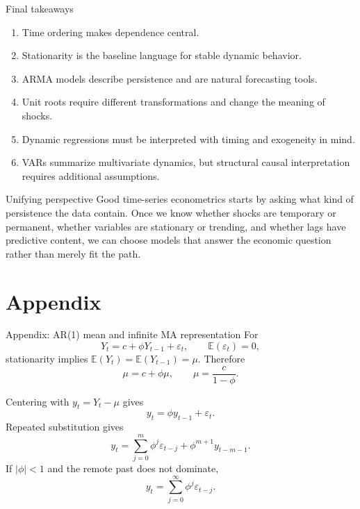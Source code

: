 \documentclass[10pt]{beamer}
\newcommand{\E}{\mathbb{E}}
\newcommand{\eps}{\varepsilon}
\begin{document}
\begin{frame}{Final takeaways}
\small
\begin{enumerate}
  \item Time ordering makes dependence central.
  \item Stationarity is the baseline language for stable dynamic behavior.
  \item ARMA models describe persistence and are natural forecasting tools.
  \item Unit roots require different transformations and change the meaning of shocks.
  \item Dynamic regressions must be interpreted with timing and exogeneity in mind.
  \item VARs summarize multivariate dynamics, but structural causal interpretation requires additional assumptions.
\end{enumerate}

\pause
\begin{alertblock}{Unifying perspective}
Good time-series econometrics starts by asking what kind of persistence the data contain. Once we know whether shocks are temporary or permanent, whether variables are stationary or trending, and whether lags have predictive content, we can choose models that answer the economic question rather than merely fit the path.
\end{alertblock}
\end{frame}

\appendix
\section*{Appendix}

\begin{frame}{Appendix: AR(1) mean and infinite MA representation}
\label{app:ar1-moments}
\small
For
\[
Y_t=c+\phi Y_{t-1}+\eps_t,
\qquad
\E(\eps_t)=0,
\]
stationarity implies $\E(Y_t)=\E(Y_{t-1})=\mu$. Therefore
\[
\mu=c+\phi\mu,
\qquad
\mu=\frac{c}{1-\phi}.
\]

Centering with $y_t=Y_t-\mu$ gives
\[
y_t=\phi y_{t-1}+\eps_t.
\]
Repeated substitution gives
\[
y_t=\sum_{j=0}^{m}\phi^j\eps_{t-j}+\phi^{m+1}y_{t-m-1}.
\]
If $|\phi|<1$ and the remote past does not dominate,
\[
y_t=\sum_{j=0}^{\infty}\phi^j\eps_{t-j}.
\]

\hfill\hyperlink{slide:ar1_mean}{}
\end{frame}
\end{document}
